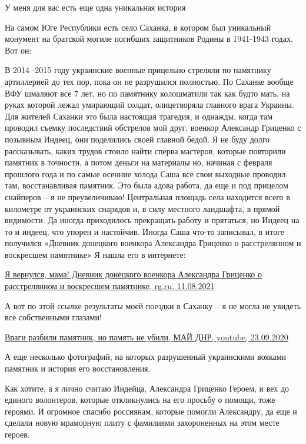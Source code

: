 У меня для вас есть еще одна уникальная история

На самом Юге Республики есть село Саханка, в котором был уникальный монумент на
братской могиле погибших защитников Родины в 1941-1943 годах. Вот он:

В 2014 -2015 году украинские военные прицельно стреляли по памятнику
артиллерией до тех пор, пока он не разрушился полностью. По Саханке вообще ВФУ
шмаляют все 7 лет, но по памятнику колошматили так как будто мать, на руках
которой лежал умирающий солдат, олицетворяла главного врага Украины. Для
жителей Саханки это была настоящая трагедия, и однажды, когда там проводил
съемку последствий обстрелов мой друг, военкор Александр Гриценко с позывным
Индеец, они поделились своей главной бедой. Я не буду долго рассказывать, каких
трудов стоило найти сперва мастеров, которые повторили памятник в точности, а
потом деньги на материалы но, начиная с февраля прошлого года и по самые
осенние холода Саша все свои выходные проводил там, восстанавливая памятник.
Это была адова работа, да еще и под прицелом снайперов – я не преувеличиваю!
Центральная площадь села находится всего в километре от украинских снарядов и,
в силу местного ландшафта, в прямой видимости. Да иногда приходилось прекращать
работу и прятаться, но Индеец на то и индеец, что упорен и настойчив. Иногда
Саша что-то записывал, в итоге получился «Дневник донецкого военкора Александра
Гриценко о расстрелянном и воскресшем памятнике» Я нашла его в интернете:

\href{https://rg.ru/2021/08/11/dnevnik-doneckogo-voenkora-aleksandra-gricenko-o-rasstreliannom-i-voskresshem-pamiatnike.html}{%
Я вернулся, мама!  Дневник донецкого военкора Александра Гриценко о расстрелянном и воскресшем памятнике, %
rg.ru, 11.08.2021%
}

А вот по этой ссылке результаты моей поездки в Саханку – я не могла не увидеть
все собственными глазами!

\href{https://youtu.be/3v7-lnzUc1k}{%
Враги разбили памятник, но память не убили, МАЙ ДНР, youtube, 23.09.2020%
}

А еще несколько фотографий, на которых разрушенный украинскими вояками памятник
и история его восстановления.


Как хотите, а я лично считаю Индейца, Александра Гриценко Героем, и вех до
единого волонтеров, которые откликнулись на его просьбу о помощи, тоже героями.
И огромное спасибо россиянам, которые помогли Александру, да еще и сделали
новую мраморную плиту с фамилиями захороненных на этом месте героев.


